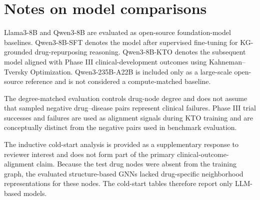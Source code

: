 \documentclass[pdflatex,sn-mathphys-num]{sn-jnl}
\begin{document}
\clearpage

\section*{Notes on model comparisons}

Llama3-8B and Qwen3-8B are evaluated as open-source foundation-model
baselines. Qwen3-8B-SFT denotes the model after supervised fine-tuning
for KG-grounded drug-repurposing reasoning. Qwen3-8B-KTO denotes the
subsequent model aligned with Phase III clinical-development outcomes
using Kahneman--Tversky Optimization. Qwen3-235B-A22B is included only
as a large-scale open-source reference and is not considered a
compute-matched baseline.

The degree-matched evaluation controls drug-node degree and does not
assume that sampled negative drug--disease pairs represent clinical
failures. Phase III trial successes and failures are used as alignment
signals during KTO training and are conceptually distinct from the
negative pairs used in benchmark evaluation.

The inductive cold-start analysis is provided as a supplementary
response to reviewer interest and does not form part of the primary
clinical-outcome-alignment claim. Because the test drug nodes were
absent from the training graph, the evaluated structure-based GNNs
lacked drug-specific neighborhood representations for these nodes.
The cold-start tables therefore report only LLM-based models.
\end{document}
